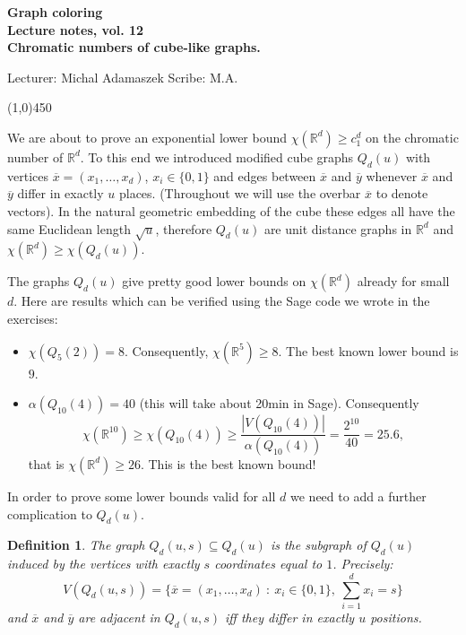\documentclass[a4paper]{article}
\theoremstyle{plain}
\newtheorem{definition}[lemma]{Definition}
\theoremstyle{myremark}
\newcommand{\oo}[1]{\overline{#1}}
\newcommand{\RR}{\mathbb{R}}
\newcommand{\LECTURENUMBER}{12}
\newcommand{\LECTURETITLE}{Chromatic numbers of cube-like graphs.}
\newcommand{\LECTURESCRIBE}{M.A.}
\begin{document}
\thispagestyle{empty}

\begin{center}
	{\Large\bf Graph coloring}\\
	{\bf Lecture notes, vol. \LECTURENUMBER \\ 
	\LECTURETITLE}\\
\end{center}
Lecturer: Michal Adamaszek \hfill Scribe: \LECTURESCRIBE
\begin{center}
\line(1,0){450}
\end{center}


We are about to prove an exponential lower bound $\chi(\RR^d)\geq c_1^d$ on the chromatic number of $\RR^d$. To this end we introduced modified cube graphs $Q_d(u)$ with vertices $\oo{x}=(x_1,\ldots,x_d)$, $x_i\in\{0,1\}$ and edges between $\oo{x}$ and $\oo{y}$ whenever $\oo{x}$ and $\oo{y}$ differ in exactly $u$ places. (Throughout we will use the overbar $\oo{x}$ to denote vectors). In the natural geometric embedding of the cube these edges all have the same Euclidean length $\sqrt{u}$, therefore $Q_d(u)$ are unit distance graphs in $\RR^d$ and $\chi(\RR^d)\geq \chi(Q_d(u))$.


The graphs $Q_d(u)$ give pretty good lower bounds on $\chi(\RR^d)$ already for small $d$. Here are results which can be verified using the Sage code we wrote in the exercises:
\begin{itemize}
\item $\chi(Q_5(2))=8$. Consequently, $\chi(\RR^5)\geq 8$. The best known lower bound is $9$.
\item $\alpha(Q_{10}(4))=40$ (this will take about 20min in Sage). Consequently
$$\chi(\RR^{10})\geq\chi(Q_{10}(4))\geq\frac{|V(Q_{10}(4))|}{\alpha(Q_{10}(4))}=\frac{2^{10}}{40}=25.6,$$
that is $\chi(\RR^d)\geq 26$. This is the best known bound!
\end{itemize}

In order to prove some lower bounds valid for all $d$ we need to add a further complication to $Q_d(u)$.

\begin{definition}
The graph $Q_d(u,s)\subseteq Q_d(u)$ is the subgraph of $Q_d(u)$ induced by the vertices with exactly $s$ coordinates equal to $1$. Precisely:
$$V(Q_d(u,s))=\{\oo{x}=(x_1,\ldots,x_d)~:~x_i\in\{0,1\},\ \sum_{i=1}^d x_i=s\}$$
and $\oo{x}$ and $\oo{y}$ are adjacent in $Q_d(u,s)$ iff they differ in exactly $u$ positions.
\end{definition}
\end{document}
